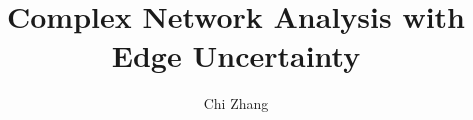 \documentclass[12pt]{report}          %
\title{Complex Network Analysis with Edge Uncertainty} %
\author{Chi Zhang}
\newcommand{\onlyinsubfile}[1]{#1}
\newcommand{\notinsubfile}[1]{}
\begin{document}
\renewcommand{\onlyinsubfile}[1]{}
\renewcommand{\notinsubfile}[1]{#1}

\preamblepagenumbering %
\titlepage %



\doublespacing



%






\singlespacing %
               
\tableofcontents
\listoftables  %
\listoffigures %

               
               
\doublespacing
\end{document}
